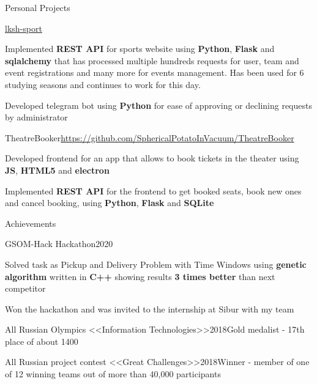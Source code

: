 \documentclass{./resume} %
\begin{document}
\begin{rSection}{Personal Projects}
    \begin{rSubsection}{\href{https://github.com/SphericalPotatoInVacuum/lksh_sport}{lksh-sport}}{}{}{}
        \item Implemented \textbf{REST API} for sports website using
        \textbf{Python}, \textbf{Flask} and \textbf{sqlalchemy} that
        has processed multiple hundreds requests for user, team and event registrations
        and many more for events management. Has been used for 6 studying seasons and continues to work for this day.
        \item Developed telegram bot using \textbf{Python} for ease of approving
        or declining requests by administrator
    \end{rSubsection}
    \begin{rSubsection}{TheatreBooker}{\url{https://github.com/SphericalPotatoInVacuum/TheatreBooker}}{}{}
        \item Developed frontend for an app that allows to book tickets in the theater using \textbf{JS}, \textbf{HTML5} and \textbf{electron}
        \item Implemented \textbf{REST API} for the frontend to get booked seats, book new ones and cancel booking, using \textbf{Python}, \textbf{Flask} and \textbf{SQLite}
    \end{rSubsection}
\end{rSection}


\begin{rSection}{Achievements}
    \begin{rSubsection}
        {GSOM-Hack Hackathon}{2020}{}{}
        \item Solved task as Pickup and Delivery Problem with Time Windows using
        \textbf{genetic algorithm} written in \textbf{C++} showing
        results \textbf{3 times better} than next competitor
        \item Won the hackathon and was invited to the internship at Sibur with my team
    \end{rSubsection}
    \begin{rSubsubsection}
        {All Russian Olympics <<Information Technologies>>}{2018}{Gold medalist - 17th place of about 1400}{}
    \end{rSubsubsection}
    \begin{rSubsubsection}
        {All Russian project contest <<Great Challenges>>}{2018}{Winner - member of one of 12 winning teams out of more than 40,000 participants}{}
    \end{rSubsubsection}
\end{rSection}
\end{document}
